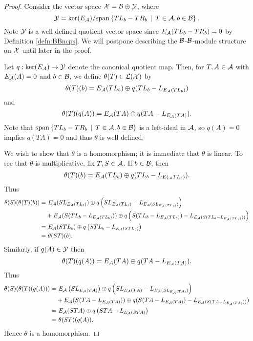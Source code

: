 \begin{proof}
	Consider the vector space $\mathcal{X} = \mathcal{B} \oplus \mathcal{Y}$, where
	\[
		\mathcal{Y} = \ker(E_{\mathcal{A}}) / \mathrm{span}\left\{TL_b - TR_b \, \mid \, T \in \mathcal{A}, b \in \mathcal{B}\right\}.
	\]
	Note $\mathcal{Y}$ is a well-defined quotient vector space since $E_{\mathcal{A}}(TL_b - TR_b) = 0$ by Definition \ref{defn:BBncps}.
	We will postpone describing the $\mathcal{B}$-$\mathcal{B}$-module structure on $\mathcal{X}$ until later in the proof.

	Let $q : \ker(E_{\mathcal{A}}) \to \mathcal{Y}$ denote the canonical quotient map.
	Then, for $T, A \in \mathcal{A}$ with $E_{\mathcal{A}}(A) = 0$ and $b \in \mathcal{B}$, we define $\theta(T) \in \mathcal{L}(\mathcal{X})$ by
	\[
		\theta(T)(b) = E_{\mathcal{A}}(TL_b) \oplus q(TL_b - L_{E_{\mathcal{A}}(TL_b)})
	\]
	and
	\[
		\theta(T)(q(A)) = E_{\mathcal{A}}(TA) \oplus q(TA - L_{E_{\mathcal{A}}(TA)}).
	\]
	Note that $\mathrm{span}\left\{TL_b - TR_b \, \mid \, T \in \mathcal{A}, b \in \mathcal{B}\right\}$ is a left-ideal in $\mathcal{A}$, so $q(A) = 0$ implies $q(TA) = 0$ and thus $\theta$ is well-defined.



	We wish to show that $\theta$ is a homomorphism; it is immediate that $\theta$ is linear.
	To see that $\theta$ is multiplicative, fix $T, S \in \mathcal{A}$.
	If $b \in \mathcal{B}$, then
	\[
		\theta(T)(b) = E_{\mathcal{A}}(TL_b) \oplus q(TL_b - L_{E(_{\mathcal{A}}TL_b)}).
	\]
	Thus
	\begin{align*}
		\theta(S)(\theta(T)(b))
		= & \,\,E_{\mathcal{A}}(SL_{E_{\mathcal{A}}(TL_b)}) \oplus q\left(SL_{E_{\mathcal{A}}(TL_b)} - L_{E_{\mathcal{A}}(SL_{E_{\mathcal{A}}(TL_b)})}
		\right) \\
		& + E_{\mathcal{A}}(S (TL_b - L_{E_{\mathcal{A}}(TL_b)})) \oplus q\left(S(TL_b - L_{E_{\mathcal{A}}(TL_b)}) - L_{E_{\mathcal{A}}(S(TL_b - L_{E_{\mathcal{A}}(TL_b)}))}
		\right)
		\\
		= & \,\,E_{\mathcal{A}}(STL_b) \oplus q\left(STL_b - L_{E_{\mathcal{A}}(STL_b)}\right)
		\\
		= & \,\,\theta(ST)(b).
	\end{align*}
	Similarly, if $q(A)\in \mathcal{Y}$ then
	\[
		\theta(T)(q(A)) = E_{\mathcal{A}}(TA) \oplus q(TA - L_{E_{\mathcal{A}}(TA)}).
	\]
	Thus
	\begin{align*}
		\theta(S)(\theta(T)(q(A))) = &\,\, E_{\mathcal{A}}\left(SL_{E_{\mathcal{A}}(TA)}\right) \oplus q\left(SL_{E_{\mathcal{A}}(TA)} - L_{E_{\mathcal{A}}(SL_{E_{\mathcal{A}}(TA)})} \right) \\
		& + E_{\mathcal{A}}(S(TA - L_{E_{\mathcal{A}}(TA)})) \oplus q(S(TA - L_{E_{\mathcal{A}}(TA)}) - L_{E_{\mathcal{A}}(S(TA - L_{E_{\mathcal{A}}(TA)}))} )\\
		= & \,\,E_{\mathcal{A}}(STA) \oplus q\left( STA - L_{E_{\mathcal{A}}(STA)}\right) \\
		= & \,\,\theta(ST)(q(A)).
	\end{align*}
	Hence $\theta$ is a homomorphism.







\end{proof}

